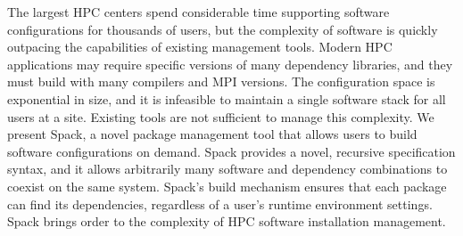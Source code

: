 
The largest HPC centers spend considerable time supporting software configurations for thousands of users, but the complexity of software is quickly outpacing the capabilities of existing management tools. Modern HPC applications may require specific versions of many dependency libraries, and they must build with many compilers and MPI versions. The configuration space is exponential in size, and it is infeasible to maintain a single software stack for all users at a site. Existing tools are not sufficient to manage this complexity. We present Spack, a novel package management tool that allows users to build software configurations on demand. Spack provides a novel, recursive specification syntax, and it allows arbitrarily many software and dependency combinations to coexist on the same system. Spack's build mechanism ensures that each package can find its dependencies, regardless of a user's runtime environment settings. Spack brings order to the complexity of HPC software installation management.
